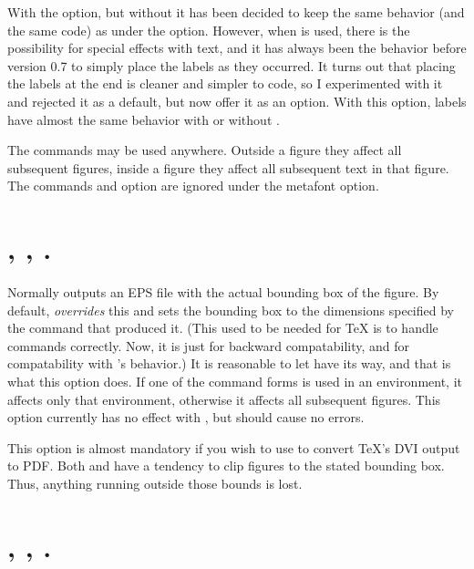 \documentclass[letterpaper]{article}
\begin{document}
With the  option, but without  it has been
decided to keep the same behavior (and the same code) as under the
 option. However, when  is used, there is
the possibility for special effects with text, and it has always been
the behavior before version 0.7 to simply place the labels as they
occurred. It turns out that placing the labels at the end is cleaner and
simpler to code, so I experimented with it and rejected it as a default,
but now offer it as an option. With this option, \mfp{} labels have
almost the same behavior with or without .

The commands may be used anywhere. Outside a figure they affect all
subsequent figures, inside a figure they affect all subsequent text in
that figure. The commands and option are ignored under the metafont
option.


\section{, , .}%
\label{truebbox}%
%
%

Normally \MP{} outputs an EPS file with the actual bounding box of the
figure. By default, \mfp{} \emph{overrides} this and sets the bounding
box to the dimensions specified by the  command that produced
it. (This used to be needed for \TeX{} is to handle  commands
correctly. Now, it is just for backward compatability, and for
compatability with \MF{}'s behavior.) It is reasonable to let \MP{} have
its way, and that is what this option does. If one of the command forms
is used in an  environment, it affects only that environment,
otherwise it affects all subsequent figures. This option currently has
no effect with \MF{}, but should cause no errors.

This option is almost mandatory if you wish to use  to
convert \TeX{}'s DVI output to PDF. Both  and
 have a tendency to clip \MP{} figures to the stated
bounding box. Thus, anything running outside those bounds is lost.


\section{, , .}\label{clip}
%
%
\end{document}

